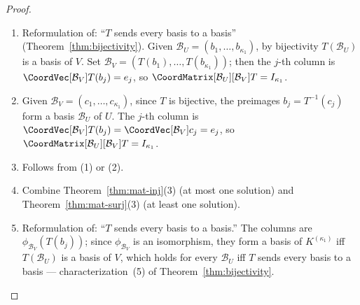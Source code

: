 \begin{proof}
    \leavevmode
    \begin{enumerate}
        \item Reformulation of: ``$T$ sends every basis to a basis''
              (Theorem~\ref{thm:bijectivity}). Given
              $\mathcal{B}_U = (b_1, \ldots, b_{\kappa_1})$, by bijectivity
              $T(\mathcal{B}_U)$ is a basis of $V$. Set
              $\mathcal{B}_V = (T(b_1), \ldots, T(b_{\kappa_1}))$; then the $j$-th column
              is $\CoordVec[\mathcal{B}_V]{T(b_j)} = e_j$, so
              $\CoordMatrix[\mathcal{B}_U][\mathcal{B}_V]{T} = I_{\kappa_1}$.

        \item Given $\mathcal{B}_V = (c_1, \ldots, c_{\kappa_1})$, since $T$ is bijective,
              the preimages $b_j = T^{-1}(c_j)$ form a basis $\mathcal{B}_U$ of $U$. The
              $j$-th column is $\CoordVec[\mathcal{B}_V]{T(b_j)} = \CoordVec[\mathcal{B}_V]{c_j}
              = e_j$, so $\CoordMatrix[\mathcal{B}_U][\mathcal{B}_V]{T} = I_{\kappa_1}$.

        \item Follows from (1) or (2).

        \item Combine Theorem~\ref{thm:mat-inj}(3) (at most one solution) and
              Theorem~\ref{thm:mat-surj}(3) (at least one solution).

        \item Reformulation of: ``$T$ sends every basis to a basis.''
              The columns are $\phi_{\mathcal{B}_V}(T(b_j))$; since $\phi_{\mathcal{B}_V}$
              is an isomorphism, they form a basis of $K^{(\kappa_1)}$ iff $T(\mathcal{B}_U)$
              is a basis of $V$, which holds for every $\mathcal{B}_U$ iff $T$ sends every
              basis to a basis --- characterization~(5) of
              Theorem~\ref{thm:bijectivity}. \qedhere
    \end{enumerate}
\end{proof}

